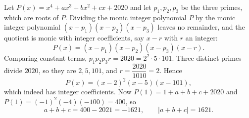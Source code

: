 Let $P(x)=x^4+ax^3+bx^2+cx+2020$ and let $p_1,p_2,p_3$ be the three primes, which are roots of $P$. Dividing the monic integer polynomial $P$ by the monic integer polynomial $(x-p_1)(x-p_2)(x-p_3)$ leaves no remainder, and the quotient is monic with integer coefficients, say $x-r$ with $r$ an integer:
\[P(x)=(x-p_1)(x-p_2)(x-p_3)(x-r).\]
Comparing constant terms, $p_1p_2p_3r=2020=2^2\cdot5\cdot101$. Three distinct primes divide $2020$, so they are $2,5,101$, and $r=\dfrac{2020}{1010}=2$. Hence
\[P(x)=(x-2)^2(x-5)(x-101),\]
which indeed has integer coefficients. Now $P(1)=1+a+b+c+2020$ and $P(1)=(-1)^2(-4)(-100)=400$, so
\[a+b+c=400-2021=-1621,\qquad |a+b+c|=\boxed{1621}.\]
